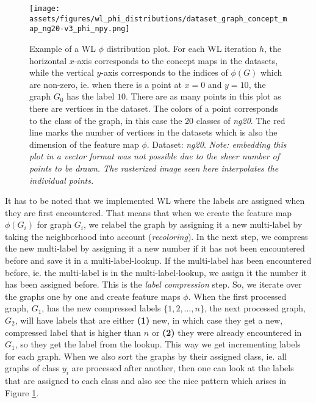 \begin{figure}[htb!]
	\centering
	{\texttt{[image: assets/figures/wl\_phi\_distributions/dataset\_graph\_concept\_map\_ng20-v3\_phi\_npy.png]}
		\caption[Example: $\phi$ distribution plot]{%
			Example of a WL $\phi$ distribution plot.
			For each WL iteration $h$, the horizontal $x$-axis corresponds to the concept maps in the datasets, while the vertical $y$-axis corresponds to the indices of $\phi(G)$ which are non-zero, ie. when there is a point at $x=0$ and $y=10$, the graph $G_0$ has the label $10$.
			There are as many points in this plot as there are vertices in the dataset.
			The colors of a point corresponds to the class of the graph, in this case the 20 classes of \textit{ng20}.
			The red line marks the number of vertices in the datasets which is also the dimension of the feature map $\phi$.
			Dataset: \textit{ng20}.
			\textit{Note: embedding this plot in a vector format  was not possible due to the sheer number of points to be drawn. The rasterized image seen here interpolates the individual points.}
		}%
		\label{fig:phi_distribution_example}}
\end{figure}

It has to be noted that we implemented WL where the labels are assigned when they are first encountered. That means that when we create the feature map $\phi(G_i)$ for graph $G_i$, we relabel the graph by assigning it a new multi-label by taking the neighborhood into account (\textit{recoloring}). In the next step, we compress the new multi-label by assigning it a new number if it has not been encountered before and save it in a multi-label-lookup. If the multi-label has been encountered before, ie. the multi-label is in the multi-label-lookup, we assign it the number it has been assigned before.
This is the \textit{label compression} step.
So, we iterate over the graphs one by one and create feature maps $\phi$.
When the first processed graph, $G_1$, has the new compressed labels $\{1, 2, \ldots, n\}$, the next processed graph, $G_2$, will have labels that are either \textbf{(1)} new, in which case they get a new, compressed label that is higher than $n$ or \textbf{(2)} they were already encountered in $G_1$, so they get the label from the lookup.
This way we get incrementing labels for each graph.
When we also sort the graphs by their assigned class, ie. all graphs of class $y_i$ are processed after another, then one can look at the labels that are assigned to each class and also see the nice pattern which arises in Figure \ref{fig:phi_distribution_example}.

